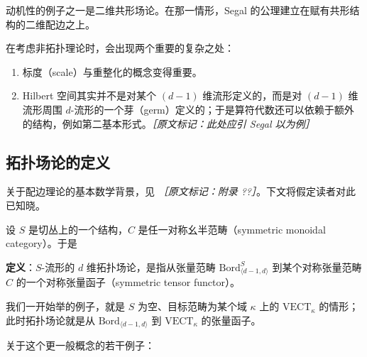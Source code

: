 动机性的例子之一是二维共形场论。在那一情形，Segal 的公理建立在赋有共形结构的二维配边之上。

在考虑非拓扑理论时，会出现两个重要的复杂之处：

\begin{enumerate}
  \item 标度（scale）与重整化的概念变得重要。
  \item Hilbert 空间其实并不是对某个 $(d-1)$ 维流形定义的，而是对 $(d-1)$ 维流形周围 $d$-流形的一个芽（germ）定义的；于是算符代数还可以依赖于额外的结构，例如第二基本形式。{\small\itshape ［原文标记：此处应引 Segal 以为例］}
\end{enumerate}

\subsection{拓扑场论的定义} %

关于配边理论的基本数学背景，见 {\small\itshape ［原文标记：附录 ??］}。下文将假定读者对此已知晓。

设 $S$ 是切丛上的一个结构，$C$ 是任一对称幺半范畴（symmetric monoidal category）。于是

\textbf{定义}：$S$-流形的 $d$ 维拓扑场论，是指从张量范畴 $\mathrm{Bord}^S_{\langle d-1,d\rangle}$ 到某个对称张量范畴 $C$ 的一个对称张量函子（symmetric tensor functor）。

我们一开始举的例子，就是 $S$ 为空、目标范畴为某个域 $\kappa$ 上的 $\mathrm{VECT}_\kappa$ 的情形；此时拓扑场论就是从 $\mathrm{Bord}_{\langle d-1,d\rangle}$ 到 $\mathrm{VECT}_\kappa$ 的张量函子。

关于这个更一般概念的若干例子：

